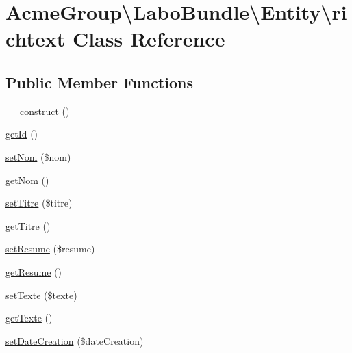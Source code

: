 \hypertarget{class_acme_group_1_1_labo_bundle_1_1_entity_1_1richtext}{\section{Acme\+Group\textbackslash{}Labo\+Bundle\textbackslash{}Entity\textbackslash{}richtext Class Reference}
\label{class_acme_group_1_1_labo_bundle_1_1_entity_1_1richtext}
}
\subsection*{Public Member Functions}
\begin{DoxyCompactItemize}
\item 
\hyperlink{class_acme_group_1_1_labo_bundle_1_1_entity_1_1richtext_adca648e3aeb5b9ac78c1c811d5c8cf7e}{\+\_\+\+\_\+construct} ()
\item 
\hyperlink{class_acme_group_1_1_labo_bundle_1_1_entity_1_1richtext_a57bddbd5129d1e71a72c084ba55a2697}{get\+Id} ()
\item 
\hyperlink{class_acme_group_1_1_labo_bundle_1_1_entity_1_1richtext_a5b501af7d183f9a2c10c7178f89afcb9}{set\+Nom} (\$nom)
\item 
\hyperlink{class_acme_group_1_1_labo_bundle_1_1_entity_1_1richtext_a05c5775ebc4a373b0aa1e98d4bddfe12}{get\+Nom} ()
\item 
\hyperlink{class_acme_group_1_1_labo_bundle_1_1_entity_1_1richtext_a3b1e40a186139330bdae62664d53d737}{set\+Titre} (\$titre)
\item 
\hyperlink{class_acme_group_1_1_labo_bundle_1_1_entity_1_1richtext_a702ff77b4721bd88c0f557985960d94f}{get\+Titre} ()
\item 
\hyperlink{class_acme_group_1_1_labo_bundle_1_1_entity_1_1richtext_a79cbecfc6984fe61e1c03294db7e11fb}{set\+Resume} (\$resume)
\item 
\hyperlink{class_acme_group_1_1_labo_bundle_1_1_entity_1_1richtext_af1323abc725790020dd1c74b1bd54a3c}{get\+Resume} ()
\item 
\hyperlink{class_acme_group_1_1_labo_bundle_1_1_entity_1_1richtext_a096cb9fd8879aa027831f386c91ededf}{set\+Texte} (\$texte)
\item 
\hyperlink{class_acme_group_1_1_labo_bundle_1_1_entity_1_1richtext_a452f3e0a689d667100077b4d581cbfa4}{get\+Texte} ()
\item 
\hyperlink{class_acme_group_1_1_labo_bundle_1_1_entity_1_1richtext_ae26a986396e85752c229b2181f389f49}{set\+Date\+Creation} (\$date\+Creation)

\end{DoxyCompactItemize}
